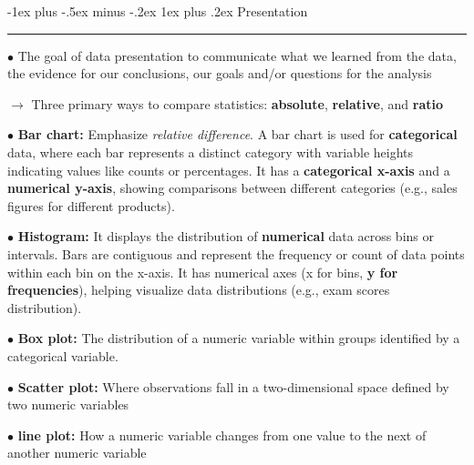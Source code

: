 \documentclass[letterpaper, 10.5pt,landscape]{article}
\makeatletter
\renewcommand{\subsubsection}{\@startsection{subsubsection}{3}{0mm}%
                                {-1ex plus -.5ex minus -.2ex}%
                                {1ex plus .2ex}%
                                {\normalfont\small\bfseries}}
\makeatother
\begin{document}
\begin{multicols*}{3}
\vspace{5pt}

\subsubsection{Presentation} {\color{teal}\hrule height 0.5pt} \smallskip
$\bullet$ The goal of data presentation to communicate what we learned from the data, the evidence for our conclusions, our goals and/or questions for the analysis\\

\vspace{2pt}


$\rightarrow$ Three primary ways to compare statistics: \textbf{absolute}, \textbf{relative}, and \textbf{ratio} \\
\vspace{2pt}

$\bullet$ \textbf{Bar chart: } Emphasize \textit{relative difference}. A bar chart is used for \textbf{categorical} data, where each bar represents a distinct category with variable heights indicating values like counts or percentages. It has a \textbf{categorical x-axis} and a \textbf{numerical y-axis}, showing comparisons between different categories (e.g., sales figures for different products).
\vspace{2pt}


$\bullet$ \textbf{Histogram: } It displays the distribution of \textbf{numerical} data across bins or intervals. Bars are contiguous and represent the frequency or count of data points within each bin on the x-axis. It has numerical axes (x for bins, \textbf{y for frequencies}), helping visualize data distributions (e.g., exam scores distribution).
\vspace{2pt}


$\bullet$ \textbf{Box plot: }The distribution of a numeric variable within groups identified by a categorical variable. \\
\vspace{2pt}

$\bullet$ \textbf{Scatter plot: } Where observations fall in a two-dimensional space defined by two numeric variables \\
\vspace{2pt}

$\bullet$ \textbf{line plot: } How a numeric variable changes from one value to the next of another numeric variable \\
\vspace{2pt}



\end{multicols*}
\end{document}
